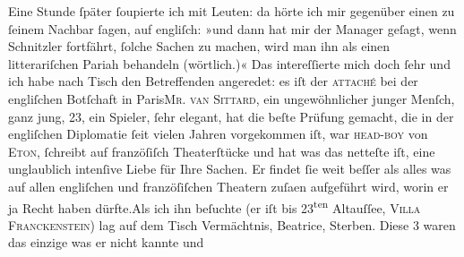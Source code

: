 \begin{ledgroupsized}[t]{13cm}
           \noindent{}Eine Stunde ſpäter ſoupierte ich mit Leuten: da hörte ich mir gegenüber einen  zu ſeinem Nachbar ſagen, auf engliſch: »und dann
               hat mir der Manager geſagt, wenn Schnitzler fortfährt, {\pb}ſolche Sachen zu machen, wird man
               ihn als einen litterariſchen Pariah behandeln (wörtlich.)« Das intereſſierte mich
               doch ſehr und ich habe nach Tisch den Betreffenden angeredet: es iſt der \textsc{attaché} bei der engliſchen
                  Botſchaft in Paris\textsc{Mr.
                     van Sittard}, ein ungewöhnlicher junger
               Menſch, ganz jung, 23, ein Spieler, ſehr elegant, hat die beſte Prüfung gemacht, die
               in {\pb}der engliſchen Diplomatie ſeit
               vielen Jahren vorgekommen iſt, war \textsc{head-boy} von \textsc{Eton}, ſchreibt auf
               franzöſiſch Theaterſtücke und hat was das netteſte iſt, eine unglaublich intenſive
               Liebe für Ihre Sachen. Er findet ſie weit beſſer als alles was auf allen engliſchen
               und franzöſiſchen Theatern zuſa{\geminationm}en aufgeführt wird,
               worin er ja Recht haben dürfte.\hspace*{1.5em}Als ich ihn beſuchte
               (er {\pb}iſt bis 23\textsuperscript{ten}{ }Altauſſee, \textsc{Villa
                     Franckenſtein}) lag auf dem Tisch Vermächtnis, Beatrice, Sterben. Diese 3 waren das einzige was er nicht kannte und

\end{ledgroupsized}
